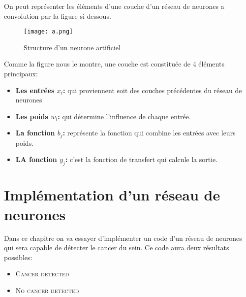 \documentclass[a4paper,11pt]{report}
\theoremstyle{definition}
\begin{document}
On peut représenter les éléments d'une couche d'un réseau de neurones a convolution par la figure si dessous. \cite{ref6}\\

 \begin{figure}[!htbp]
   \begin{center}
   \texttt{[image: a.png]}
   \caption{Structure d'un neurone artificiel}
   \end{center}
   \end{figure}

Comme la figure nous le montre, une couche est constituée de 4 éléments principaux: \\

\begin{itemize}
    \item [\cdot]  \textbf{Les entrées $x_{i}$:} qui proviennent soit des couches précédentes du réseau de neurones
     \item [\cdot] \textbf{Les poids $w_{i}$:} qui détermine l'influence de chaque entrée. 
      \item [\cdot]  \textbf{La fonction $b_{j}$:} représente la fonction qui combine les entrées avec leurs poids.
       \item [\cdot] \textbf{LA fonction $y_{j}$:} c'est la fonction de transfert qui calcule la sortie.
\end{itemize}
























\chapter{Implémentation d'un réseau de neurones}
Dans ce chapitre on va essayer d'implémenter un code d'un réseau de neurones qui sera capable de détecter le cancer du sein. Ce code aura deux résultats possibles:
\begin{itemize}
    \item [\cdot] \textsc{Cancer detected} 
    \item [\cdot] \textsc{No cancer detected}
\end{itemize}
\end{document}
